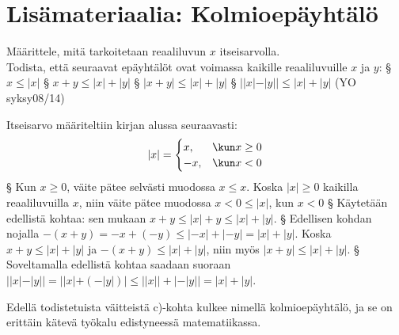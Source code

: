 \section{Lisämateriaalia: Kolmioepäyhtälö}

\begin{esimerkki}
Määrittele, mitä tarkoitetaan reaaliluvun $x$ itseisarvolla. \\
Todista, että seuraavat epäyhtälöt ovat voimassa kaikille reaaliluvuille $x$ ja $y$:
\alakohdat
§ $x \leq |x|$
§ $x+y \leq |x|+|y|$
§ $|x+y| \leq |x|+|y|$
§ $||x|-|y|| \leq |x|+|y|$
\loppu
(YO syksy08/14)
\begin{esimratk}
Itseisarvo määriteltiin kirjan alussa seuraavasti:
\[
|x|=\begin{cases}
	x, & \kun x \geq 0 \\
	-x, & \kun x < 0
\end{cases} 
\]
\alakohdat
§ Kun $x \geq 0$, väite pätee selvästi muodossa $x \leq x$. Koska $|x| \geq 0$ kaikilla reaaliluvuilla $x$, niin väite pätee muodossa $x<0 \leq |x|$, kun $x<0$
§ Käytetään edellistä kohtaa: sen mukaan $x+y \leq |x|+y \leq |x|+|y|$.
§ Edellisen kohdan nojalla $-(x+y)=-x+(-y) \leq |-x|+|-y|=|x|+|y|$. Koska $x+y \leq |x|+|y|$ ja $-(x+y) \leq |x|+|y|$, niin myös $|x+y| \leq |x|+|y|$.
§ Soveltamalla edellistä kohtaa saadaan suoraan $||x|-|y|| = ||x|+(-|y|)| \leq ||x||+|-|y|| = |x|+|y|$.
\loppu
\end{esimratk}
\end{esimerkki}

Edellä todistetuista väitteistä c)-kohta kulkee nimellä kolmioepäyhtälö, ja se on erittäin
kätevä työkalu edistyneessä matematiikassa.
